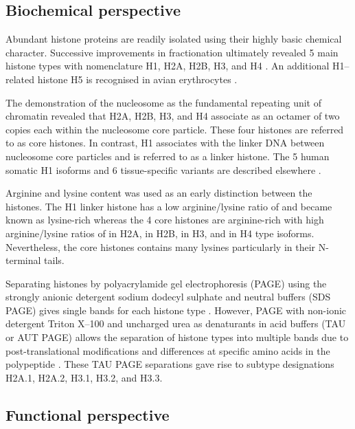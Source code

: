   \subsection{Biochemical perspective}

    Abundant histone proteins are readily isolated using their
    highly basic chemical character.
    Successive improvements in fractionation ultimately revealed 5 main histone types
    with nomenclature H1, H2A, H2B, H3, and H4 \citep{nomenclature}.
    An additional H1--related histone H5 is recognised in avian erythrocytes \citep{HFive-review}.

    The demonstration of the nucleosome as the fundamental
    repeating unit of chromatin \citep{Kornberg1974}
    revealed that H2A, H2B, H3, and H4 associate as an octamer of two copies each within the
    nucleosome core particle. These four histones are referred to as core histones.
    In contrast, H1 associates with the linker DNA between nucleosome core particles
    and is referred to as a linker histone.
    The 5 human somatic H1 isoforms and 6 tissue-specific
    variants are described elsewhere \citep{HarshmanFreitas2013}.

    Arginine and lysine content was used as an early distinction between the histones.
    The H1 linker histone has a low arginine/lysine ratio
    of \LinkerArgLysRatio{} and became known as lysine-rich
    whereas the 4 core histones are arginine-rich
    with high arginine/lysine ratios of \HTwoAArgLysRatio{} in H2A, \HTwoBArgLysRatio{} in H2B,
    \HThreeArgLysRatio{} in H3, and \HFourArgLysRatio{} in H4 type isoforms.
    Nevertheless, the core histones contains many lysines particularly in their N-terminal tails.

    Separating histones by polyacrylamide gel electrophoresis (PAGE)
    using the strongly anionic detergent sodium dodecyl sulphate and neutral buffers (SDS PAGE)
    gives single bands for each histone type \citep{ShechterHake2007}.
    However, PAGE with non-ionic detergent Triton X--100 and uncharged urea as denaturants
    in acid buffers (TAU or AUT PAGE) allows the separation
    of histone types into multiple bands
    due to post-translational modifications and differences at specific amino acids
    in the polypeptide \citep{Zweidler1977}.
    These TAU PAGE separations gave rise to subtype designations
    H2A.1, H2A.2, H3.1, H3.2, and H3.3.

  \subsection{Functional perspective}

